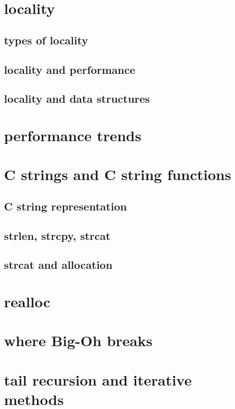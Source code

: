 

\section{locality}

\subsection{types of locality}



\subsection{locality and performance}



\subsection{locality and data structures}



\section{performance trends}


\section{C strings and C string functions}

\subsection{C string representation}




\subsection{strlen, strcpy, strcat}



\subsection{strcat and allocation}

\section{realloc}

\section{where Big-Oh breaks}

\section{tail recursion and iterative methods}


